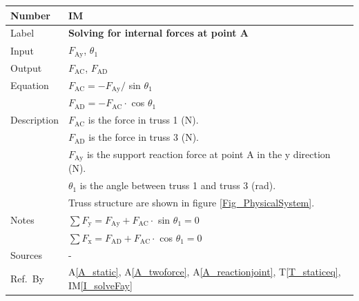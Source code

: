\documentclass[12pt]{article}
\newcommand{\colAwidth}{0.13\textwidth}
\newcommand{\colBwidth}{0.82\textwidth}
\newcommand{\tref}[1]{T\ref{#1}}
\newcommand{\aref}[1]{A\ref{#1}}
\newcounter{instnum} %
\newcommand{\iref}[1]{IM\ref{#1}}
\begin{document}
\noindent
\begin{minipage}{\textwidth}
	\renewcommand*{\arraystretch}{1.5}
	\begin{tabular}{| p{\colAwidth} | p{\colBwidth}|}
		\hline
		\rowcolor[gray]{0.9}
		Number& IM{instnum}\theinstnum \label{I_solveA}\\
		\hline
		Label& \bf Solving for internal forces at point A\\
		\hline
		Input& $F_{\text{Ay}}$, $\theta_1$\\
		\hline
		Output& $F_{\text{{AC}}}$, $F_{\text{{AD}}}$ \\
		\hline
		Equation& $F_{\text{{AC}}} = -F_{\text{Ay}} /$ sin $\theta_1$ \\
		&$F_{\text{{AD}}} = -F_{\text{{AC}}} \cdot$ cos $\theta_1$ \\
		\hline
		Description&$F_{\text{{AC}}}$ is the force in truss 1 (N).\\
		&$F_{\text{{AD}}}$ is the force in truss 3 (N).\\
		&$F_{\text{Ay}}$ is the support reaction force at point A in the y 
		direction (N).\\		
		&$\theta_1$ is the angle between truss 1 and truss 3 (\si{\radian}).\\
		&Truss structure are shown in figure \ref{Fig_PhysicalSystem}.\\
		\hline
		Notes& $\sum F_{\text{y}} = F_{\text{Ay}} + F_{\text{{AC}}} \cdot$ sin 
		$\theta_1 = 0$\\
		&$\sum F_{\text{x}} = F_{\text{AD}} + F_{\text{{AC}}} \cdot$ cos 
		$\theta_1 = 0$\\
		\hline
		Sources& - \\
		\hline
		Ref.\ By & \aref{A_static}, \aref{A_twoforce}, \aref{A_reactionjoint}, 
		\tref{T_staticeq}, \iref{I_solveFay} \\
		\hline
	\end{tabular}
\end{minipage}\\

~\newline
\end{document}
